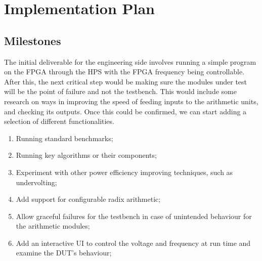 \documentclass[journal]{IEEEtran}
\begin{document}
\section{Implementation Plan}


\subsection{Milestones}
The initial deliverable for the engineering side involves running a simple
program on the FPGA through the HPS with the FPGA frequency being controllable.
After this, the next critical step would be making sure the modules under test
will be the point of failure and not the testbench.
This would include some research on ways in improving the speed of feeding
inputs to the arithmetic units, and checking its outputs.
Once this could be confirmed, we can start adding a selection of different functionalities.

\begin{enumerate}
  \item Running standard benchmarks;
  \item Running key algorithms or their components;
  \item Experiment with other power efficiency improving techniques,
        such as undervolting;
  \item Add support for configurable radix arithmetic;
  \item Allow graceful failures for the testbench in case of unintended
        behaviour for the arithmetic modules;
  \item Add an interactive UI to control the voltage and frequency at run time
        and examine the DUT’s behaviour;
\end{enumerate}
\end{document}
